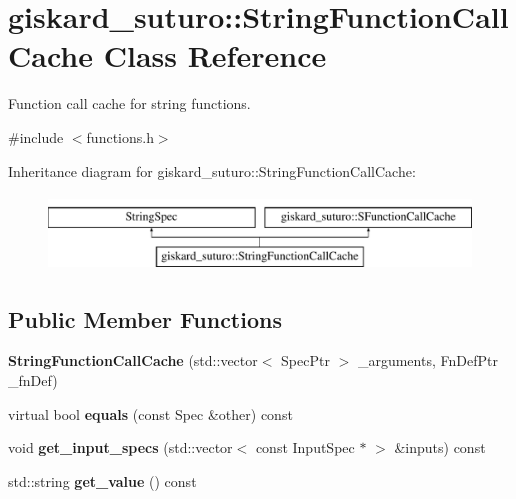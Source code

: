 \hypertarget{classgiskard__suturo_1_1StringFunctionCallCache}{\section{giskard\-\_\-suturo\-:\-:String\-Function\-Call\-Cache Class Reference}
\label{classgiskard__suturo_1_1StringFunctionCallCache}
}


Function call cache for string functions.  




{\ttfamily \#include $<$functions.\-h$>$}

Inheritance diagram for giskard\-\_\-suturo\-:\-:String\-Function\-Call\-Cache\-:\begin{figure}[H]
\begin{center}
\leavevmode
\includegraphics[height=2.000000cm]{classgiskard__suturo_1_1StringFunctionCallCache}
\end{center}
\end{figure}
\subsection*{Public Member Functions}
\begin{DoxyCompactItemize}
\item 
\hypertarget{classgiskard__suturo_1_1StringFunctionCallCache_a4c08e2104446b570b2cd8513b2a411dc}{{\bfseries String\-Function\-Call\-Cache} (std\-::vector$<$ Spec\-Ptr $>$ \-\_\-arguments, Fn\-Def\-Ptr \-\_\-fn\-Def)}\label{classgiskard__suturo_1_1StringFunctionCallCache_a4c08e2104446b570b2cd8513b2a411dc}

\item 
\hypertarget{classgiskard__suturo_1_1StringFunctionCallCache_ad9c1fd8cee7ba6bc28d5b5e13dca781d}{virtual bool {\bfseries equals} (const Spec \&other) const }\label{classgiskard__suturo_1_1StringFunctionCallCache_ad9c1fd8cee7ba6bc28d5b5e13dca781d}

\item 
\hypertarget{classgiskard__suturo_1_1StringFunctionCallCache_a363f8e53a181b7c5901314d620a3ff65}{void {\bfseries get\-\_\-input\-\_\-specs} (std\-::vector$<$ const Input\-Spec $\ast$ $>$ \&inputs) const }\label{classgiskard__suturo_1_1StringFunctionCallCache_a363f8e53a181b7c5901314d620a3ff65}

\item 
\hypertarget{classgiskard__suturo_1_1StringFunctionCallCache_a71c0149da10b3c112667440c0f02c4e1}{std\-::string {\bfseries get\-\_\-value} () const }\label{classgiskard__suturo_1_1StringFunctionCallCache_a71c0149da10b3c112667440c0f02c4e1}

\end{DoxyCompactItemize}
